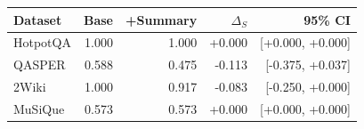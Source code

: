 \begin{tabular}{lrrrr}
\toprule
Dataset & Base & +Summary & $\Delta_S$ & 95\% CI \\
\midrule
HotpotQA & 1.000 & 1.000 & +0.000 & [+0.000, +0.000] \\
QASPER & 0.588 & 0.475 & -0.113 & [-0.375, +0.037] \\
2Wiki & 1.000 & 0.917 & -0.083 & [-0.250, +0.000] \\
MuSiQue & 0.573 & 0.573 & +0.000 & [+0.000, +0.000] \\
\bottomrule
\end{tabular}
